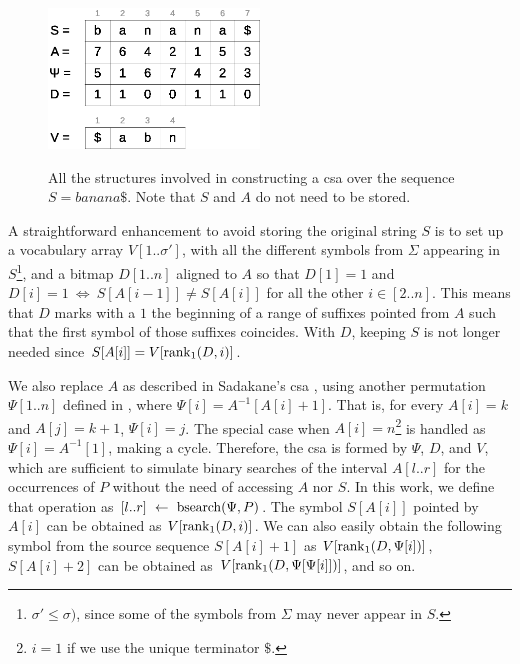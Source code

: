 \documentclass[a4paper,10pt,twoside]{book}
\begin{document}
    \begin{figure}[ht]
		\begin{center}
			{\includegraphics[width=0.5\textwidth]{figures/csa.eps}}
		\end{center}
		\caption{All the structures involved in constructing a \acrlong{csa} over the sequence $S = banana\$$. Note that $S$ and $A$ do not need to be stored.}
		\label{fig:csa}
	\end{figure}
    
    A straightforward enhancement to avoid storing the original string $S$ is to set up a vocabulary array $V[1..\sigma']$, with all the different symbols from $\Sigma$ appearing in $S$\footnote{$\sigma' \leq \sigma)$, since some of the symbols from $\Sigma$ may never appear in $S$.}, and a bitmap $D[1..n]$ aligned to $A$ so that $D[1]=1$ and $D[i]=1~\iff~S[A[i-1]] \neq S[A[i]]$ for all the other $i \in [2..n]$. This means that $D$ marks with a $1$ the beginning of a range of suffixes pointed from $A$ such that the first symbol of those suffixes coincides. With $D$, keeping $S$ is not longer needed since $S[A[i]] = V[\operatorname{rank}_1(D,i)]$.
    
    We also replace $A$ as described in Sadakane's \gls{csa} \cite{Sad03}, using
    another permutation $\Psi[1..n]$ defined in \cite{GV00}, where $\Psi[i] = A^{-1}[A[i]+1]$. That is, for every $A[i]=k$ and $A[j]=k+1$, $\Psi[i]=j$.
    The special case when $A[i]=n$\footnote{$i=1$ if we use the unique terminator $\$$.} is handled as $\Psi[i]=A^{-1}[1]$, making a cycle.
    Therefore, the \gls{csa} is formed by $\Psi$, $D$, and $V$, which are sufficient to simulate binary searches of the interval $A[l..r]$ for the occurrences of $P$ without the need of accessing $A$ nor $S$. In this work, we define that operation as $[l..r]~\leftarrow~\operatorname{bsearch}(\Psi,P)$.
    The symbol $S[A[i]]$ pointed by $A[i]$ can be obtained as
    $V[\operatorname{rank}_1(D,i)]$. We can also easily obtain the following symbol from the source sequence  $S[A[i]+1]$ as
    $V[\operatorname{rank}_1(D, \Psi[i])]$, $S[A[i]+2]$ can be obtained as $V[\operatorname{rank}_1(D, \Psi[\Psi[i]])]$, and so on.
    
\end{document}
